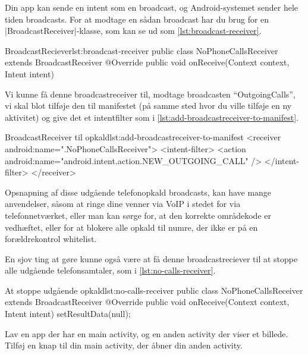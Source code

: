Din app kan sende en intent som en broadcast, og Android-systemet sender hele tiden broadcasts. For at modtage en sådan broadcast har du brug for en \JavaInline|BroadcastReceiver|-klasse, som kan se ud som \autoref{lst:broadcast-receiver}.

\begin{example}\noindent
	\begin{JavaCode}{BroadcastReciever}{lst:broadcast-receiver}
		public class NoPhoneCallsReceiver extends BroadcastReceiver {
			@Override
			public void onReceive(Context context, Intent intent) {
			}
		}
	\end{JavaCode}
\end{example}

Vi kunne få denne broadcastreceiver til, modtage broadcasten ``OutgoingCalls'', vi skal blot tilføje den til manifestet (på samme sted hvor du ville tilføje en ny aktivitet) og give det et intentfilter som i \autoref{lst:add-broadcastreceiver-to-manifest}.

\begin{example}\noindent
	\begin{XmlCode}{BroadcastReceiver til opkald}{lst:add-broadcastreceiver-to-manifest}
		<receiver android:name=".NoPhoneCallsReceiver">
			<intent-filter>
				<action android:name="android.intent.action.NEW_OUTGOING_CALL" />
			</intent-filter>
		</receiver>
	\end{XmlCode}
\end{example}

Opsnapning af disse udgående telefonopkald broadcasts, kan have mange anvendelser, såsom at ringe dine venner via VoIP i stedet for via telefonnetværket, eller man kan sørge for, at den korrekte områdekode er vedhæftet, eller for at blokere alle opkald til numre, der ikke er på en forældrekontrol whitelist.

En sjov ting at gøre kunne også være at få denne broadcastreciever til at stoppe alle udgående telefonsamtaler, som i \autoref{lst:no-calls-receiver}.

\begin{example}\noindent
	\begin{JavaCode}{At stoppe udgående opkald}{lst:no-calls-receiver}
		public class NoPhoneCallsReceiver extends BroadcastReceiver {
			@Override
			public void onReceive(Context context, Intent intent) {
				setResultData(null);
			}
		}
	\end{JavaCode}
\end{example}

\begin{exercise}
	Lav en app der har en main activity, og en anden activity der viser et billede. Tilføj en knap til din main activity, der åbner din anden activity.
\end{exercise}


